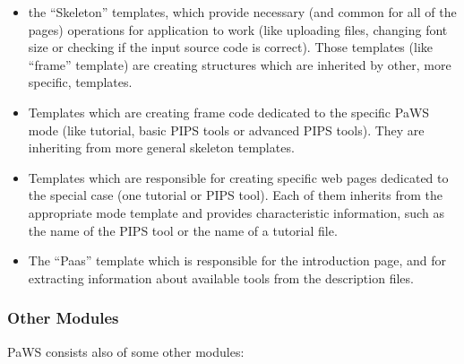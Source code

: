 \begin{itemize}

\item the ``Skeleton'' templates, which provide necessary (and common for
  all of the pages) operations for application to work (like uploading
  files, changing font size or checking if the input source code is
  correct). Those templates (like ``frame'' template) are creating
  structures which are inherited by other, more specific, templates.

\item Templates which are creating frame code dedicated to the
  specific PaWS mode (like tutorial, basic PIPS tools or advanced PIPS
  tools). They are inheriting from more general skeleton templates.

\item Templates which are responsible for creating specific web pages
  dedicated to the special case (one tutorial or PIPS tool). Each of
  them inherits from the appropriate mode template and provides
  characteristic information, such as the name of the PIPS tool or the
  name of a tutorial file.

\item The ``Paas'' template which is responsible for the introduction page,
  and for extracting information about available tools from the
  description files.

\end{itemize}

\subsubsection{Other Modules}
\label{other_modules}

PaWS consists also of some other modules:

